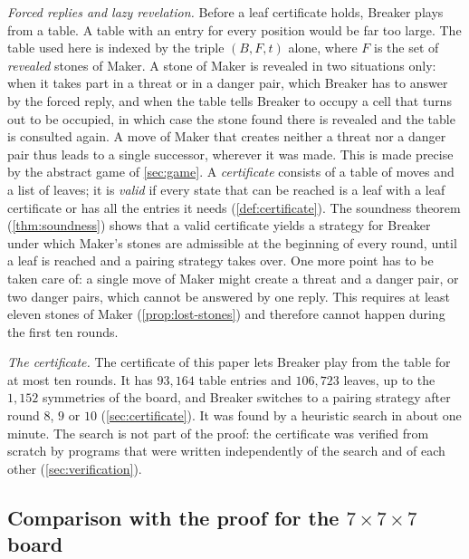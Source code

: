\emph{Forced replies and lazy revelation.} Before a leaf certificate holds, Breaker plays from a table.
A table with an entry for every position would be far too large. The table used here is indexed by the
triple $(B,F,t)$ alone, where $F$ is the set of \emph{revealed} stones of Maker. A stone of Maker is
revealed in two situations only: when it takes part in a threat or in a danger pair, which Breaker has
to answer by the forced reply, and when the table tells Breaker to occupy a cell that turns out to be
occupied, in which case the stone found there is revealed and the table is consulted again. A move of
Maker that creates neither a threat nor a danger pair thus leads to a single successor, wherever it was
made. This is made precise by the abstract game of \cref{sec:game}. A \emph{certificate} consists of a
table of moves and a list of leaves; it is \emph{valid} if every state that can be reached is a leaf
with a leaf certificate or has all the entries it needs (\cref{def:certificate}). The soundness theorem
(\cref{thm:soundness}) shows that a valid certificate yields a strategy for Breaker under which Maker's
stones are admissible at the beginning of every round, until a leaf is reached and a pairing strategy
takes over. One more point has to be taken care of: a single move of Maker might create a threat and a
danger pair, or two danger pairs, which cannot be answered by one reply. This requires at least eleven
stones of Maker (\cref{prop:lost-stones}) and therefore cannot happen during the first ten rounds.

\emph{The certificate.} The certificate of this paper lets Breaker play from the table for at most ten
rounds. It has $93{,}164$ table entries and $106{,}723$ leaves, up to the $1{,}152$ symmetries of the
board, and Breaker switches to a pairing strategy after round $8$, $9$ or $10$ (\cref{sec:certificate}).
It was found by a heuristic search in about one minute. The search is not part of the proof: the
certificate was verified from scratch by programs that were written independently of the search and of
each other (\cref{sec:verification}).

\subsection{Comparison with the proof for the \texorpdfstring{$7\times7\times7$}{7x7x7} board}
\label{ssec:intro-seven}

